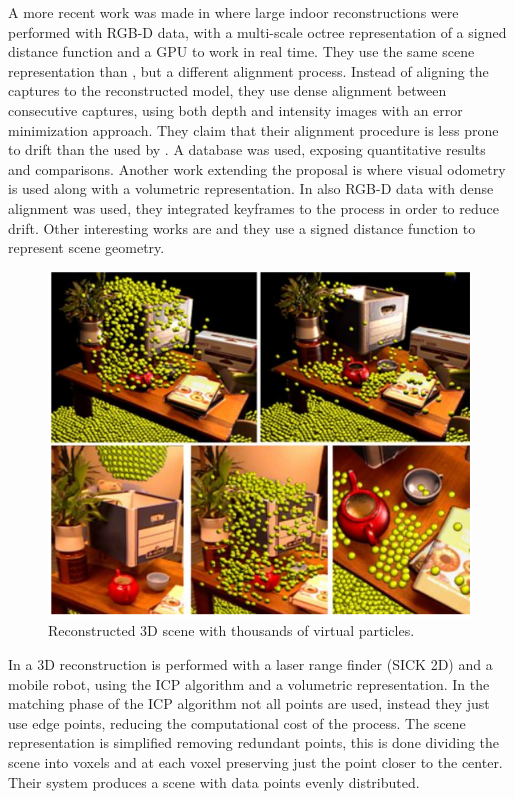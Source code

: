 A more recent work was made in \cite{Steinbrucker_2013_ICCV} where large indoor reconstructions were performed 
with RGB-D data, with a multi-scale octree representation of a signed distance function and a GPU to work in real time. They use 
the same scene representation than  \cite{izadi}, but a different alignment process. Instead of aligning the captures to the reconstructed 
model, they use dense alignment between consecutive captures, 
using both depth and intensity images with an error  minimization approach. They claim that their alignment procedure is less prone to drift than
 the used by \cite{izadi}. A database was used, exposing quantitative results and comparisons. Another work 
extending the \cite{izadi} proposal is \cite{Whelan13} where visual odometry is used along with a volumetric representation. In \cite{KerlSC13} also RGB-D data with dense alignment was used, they integrated keyframes to the process in order to reduce drift. Other 
interesting works are \cite{bylow-sturm-etal} and \cite{quadrocopter} they use a signed distance function to represent scene geometry. 


\begin{figure}[h]
\begin{center}
\includegraphics[scale=0.34]{images/izadi}
\caption{Reconstructed 3D scene with thousands of virtual particles.}
\label{fig:izadi}
\end{center}
\end{figure}


In \cite{keqiang} a 3D reconstruction is performed with a laser range finder (SICK 2D) and a mobile robot, 
using the ICP algorithm and a volumetric representation. In the matching phase of the ICP algorithm not all
 points are used, instead they just use edge points, reducing the computational cost of the process. The scene 
 representation is simplified removing redundant points, this is done dividing the scene into voxels and at each 
 voxel preserving just the point closer to the center. Their system produces a scene with data points evenly 
 distributed.

